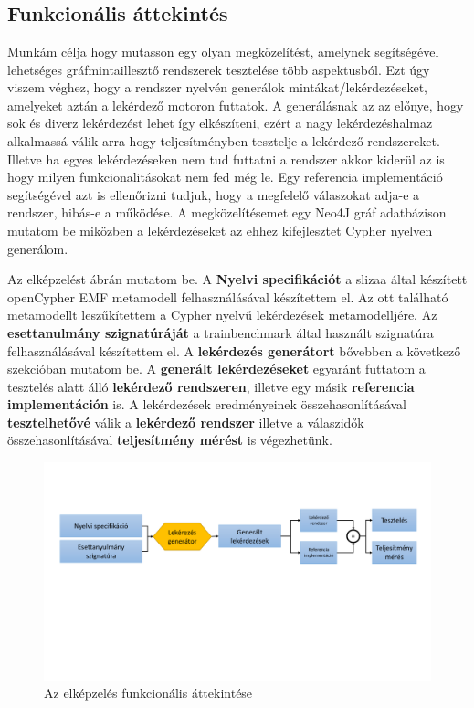 \chapter{\attekintes}

\section{Funkcionális áttekintés}

Munkám célja hogy mutasson egy olyan megközelítést, amelynek segítségével lehetséges gráfmintaillesztő
rendszerek tesztelése több aspektusból. Ezt úgy viszem véghez, hogy a rendszer nyelvén generálok
mintákat/lekérdezéseket, amelyeket aztán a lekérdező motoron futtatok. A generálásnak az az előnye,
hogy sok és diverz lekérdezést lehet így elkészíteni, ezért a nagy lekérdezéshalmaz alkalmassá válik
arra hogy teljesítményben tesztelje a lekérdező rendszereket. Illetve ha egyes lekérdezéseken nem tud
futtatni a rendszer akkor kiderül az is hogy milyen funkcionalitásokat nem fed még le. Egy 
referencia implementáció segítségével azt is ellenőrizni tudjuk, hogy a megfelelő válaszokat adja-e
a rendszer, hibás-e a működése. A megközelítésemet egy Neo4J \cite{neo4j} gráf adatbázison mutatom be 
miközben a lekérdezéseket az ehhez kifejlesztet Cypher \cite{Cypher} nyelven generálom.

Az elképzelést  ábrán mutatom be. A \textbf{Nyelvi specifikációt} a slizaa \cite{slizaa_2018} által készített openCypher EMF \cite{EMF} metamodell felhasználásával készítettem el. Az ott található metamodellt leszűkítettem a
Cypher nyelvű  lekérdezések metamodelljére. Az \textbf{esettanulmány szignatúráját} a trainbenchmark \cite{szarnyas2018train} által használt szignatúra felhasználásával készítettem el. A \textbf{lekérdezés generátort} bővebben a következő szekcióban mutatom be. A \textbf{generált lekérdezéseket} egyaránt futtatom a tesztelés alatt álló \textbf{lekérdező rendszeren}, illetve egy másik \textbf{referencia implementáción} is. A lekérdezések eredményeinek összehasonlításával \textbf{tesztelhetővé} válik a  \textbf{lekérdező rendszer} illetve a válaszidők összehasonlításával \textbf{teljesítmény mérést} is végezhetünk.

\begin{figure}
	\centering
	\includegraphics[width=1.0\textwidth]{figures/funkcionalisAttekintes}
	\caption{Az elképzelés funkcionális áttekintése}
	\label{fig:funkcionalisAttekintes}
\end{figure}
 
